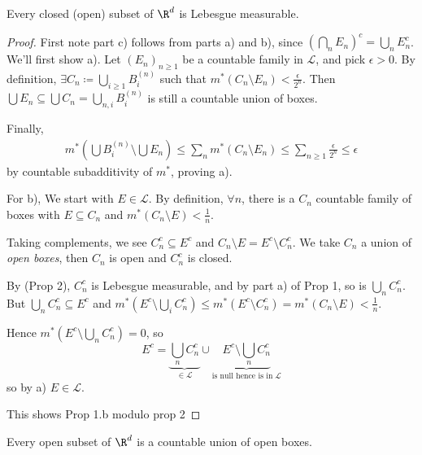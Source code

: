 \documentclass{article}
\newcommand{\1}[1]{\mathbbm{1}_{#1}}
\begin{document}
\begin{prop}
    Every closed (open) subset of $\R^d$ is Lebesgue measurable.
\end{prop}

\begin{proof} %
    First note part c) follows from parts a) and b), since $(\bigcap_n E_n)^c = \bigcup_n E_n^c$. We'll first show a).
    Let $(E_n)_{n \geq 1}$ be a countable family in $\mathcal{L}$, and pick $\epsilon > 0$.  By definition, $\exists C_n \coloneqq \bigcup_{i \geq 1} B_i^{(n)}$ such that $m^*(C_n \setminus E_n) < \frac{\epsilon}{2^n}$.
    Then $\bigcup E_n \subseteq \bigcup C_n = \bigcup_{n, i} B_i^{(n)}$ is still a countable union of boxes.

    Finally,
    \begin{align*}
        m^*\left(\bigcup B_i^{(n)} \setminus \bigcup E_n\right) \leq \sum_n m^*(C_n \setminus E_n) \leq \sum_{n \geq 1} \frac{\epsilon}{2^n} \leq \epsilon
    \end{align*}
    by countable subadditivity of $m^*$, proving a).

    For b), We start with $E \in \mathcal{L}$.  By definition, $\forall n$, there is a $C_n$ countable family of boxes with $E \subseteq C_n$ and $m^* (C_n \setminus E) < \frac1n$.

    Taking complements, we see $C_n^c \subseteq E^c$ and $C_n \setminus E = E^c \setminus C_n^c$.  We take $C_n$ a union of \textit{open boxes}, then $C_n$ is open and $C_n^c$ is closed.

    By (Prop 2), $C_n^c$ is Lebesgue measurable, and by part a) of Prop 1, so is $\bigcup_n C_n^c$. But $\bigcup_n C_n^c \subseteq E^c$ and $m^*(E^c \setminus \bigcup_i C_n^c) \leq m^*(E^c \setminus C_n^c) = m^* (C_n \setminus E) < \frac1n$.

    Hence $m^* (E^c \setminus \bigcup_n C_n^c) = 0$, so
    \begin{equation*}
        E^c = \underbrace{\bigcup_n C_n^c}_{\in \mathcal{L}} \cup \underbrace{E^c \setminus \bigcup_n C_n^c}_{\text{is null hence is in} \; \mathcal{L}}
    \end{equation*}
    so by a) $E \in \mathcal{L}$.

    This shows Prop 1.b modulo prop 2
\end{proof}

\begin{lemma}
    Every open subset of $\R^d$ is a countable union of open boxes.
\end{lemma}
\end{document}
